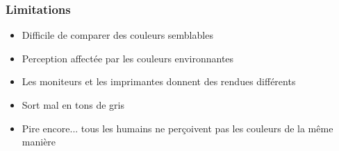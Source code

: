 \documentclass[aspectratio=169]{beamer}
\begin{document}
\begin{frame}[t]\frametitle{Limitations}



\begin{itemize}\setlength{\itemsep}{2pt}
	\item<1-> Difficile de comparer des couleurs semblables
	\item<2-> Perception affectée par les couleurs environnantes
	\item<4-> Les moniteurs et les imprimantes donnent des rendues différents
	\item<5-> Sort mal en tons de gris

	\item<6-> Pire encore... tous les humains ne perçoivent pas les couleurs de la même manière
\end{itemize}


\end{frame}
\end{document}
